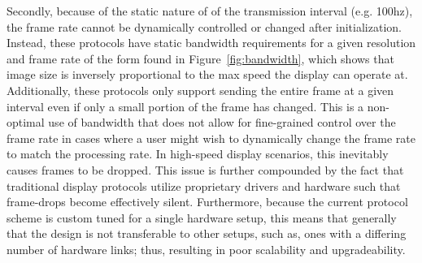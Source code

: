 Secondly, because of the static nature of of the transmission interval (e.g. 100hz), the frame rate cannot be dynamically controlled or changed after initialization. Instead, these protocols have static bandwidth requirements for a given resolution and frame rate of the form found in Figure~\ref{fig:bandwidth}, which shows that image size is inversely proportional to the max speed the display can operate at. Additionally, these protocols only support sending the entire frame at a given interval even if only a small portion of the frame has changed. This is a non-optimal use of bandwidth that does not allow for fine-grained control over the frame rate in cases where a user might wish to dynamically change the frame rate to match the processing rate. In high-speed display scenarios, this inevitably causes frames to be dropped. This issue is further compounded by the fact that traditional display protocols utilize proprietary drivers and hardware such that frame-drops become effectively silent.  Furthermore, because the current protocol scheme is custom tuned for a single hardware setup, this means that generally that the design is not transferable to other setups, such as, ones with a differing number of hardware links; thus, resulting in poor scalability and upgradeability.


